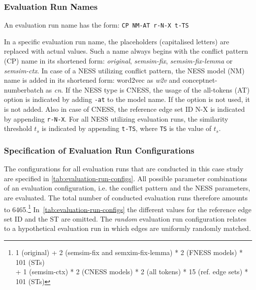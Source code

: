 \documentclass[11pt]{scrreprt}
\begin{document}
\subsubsection{Evaluation Run Names}
\label{sec:eval-run-names}
An evaluation run name has the form: \texttt{CP NM-AT r-N-X t-TS}

In a specific evaluation run name, the placeholders (capitalised letters) are replaced with actual values. Such a name always begins with the conflict pattern (CP) name in its shortened form: \textit{original}, \textit{semsim-fix}, \textit{semsim-fix-lemma} or \textit{semsim-ctx}. In case of a NESS utilizing conflict pattern, the NESS model (NM) name is added in its shortened form: word2vec as \textit{w2v} and conceptnet-numberbatch as \textit{cn}. If the NESS type is CNESS, the usage of the all-tokens (AT) option is indicated by adding \texttt{-at} to the model name. If the option is not used, it is not added. Also in case of CNESS, the reference edge set ID N-X is indicated by appending \texttt{r-N-X}. For all NESS utilizing evaluation runs, the similarity threshold \(t_s\) is indicated by appending \texttt{t-TS}, where \texttt{TS} is the value of \(t_s\).



\subsubsection{Specification of Evaluation Run Configurations}
\label{sec:evaluation-configurations}
The configurations for all evaluation runs that are conducted in this case study are specified in \cref{tab:evaluation-run-configs}. All possible parameter combinations of an evaluation configuration, i.e. the conflict pattern and the NESS parameters, are evaluated. The total number of conducted evaluation runs therefore amounts to 6465.\footnote{1 (original) + 2 (semsim-fix and semxim-fix-lemma) * 2 (FNESS models) * 101 (STs) \\ + 1 (semsim-ctx) * 2 (CNESS models) * 2 (all tokens) * 15 (ref. edge sets) * 101 (STs)} In \cref{tab:evaluation-run-configs} the different values for the reference edge set ID and the ST are omitted. The \textit{random} evaluation run configuration relates to a hypothetical evaluation run in which edges are uniformly randomly matched. 
\end{document}
